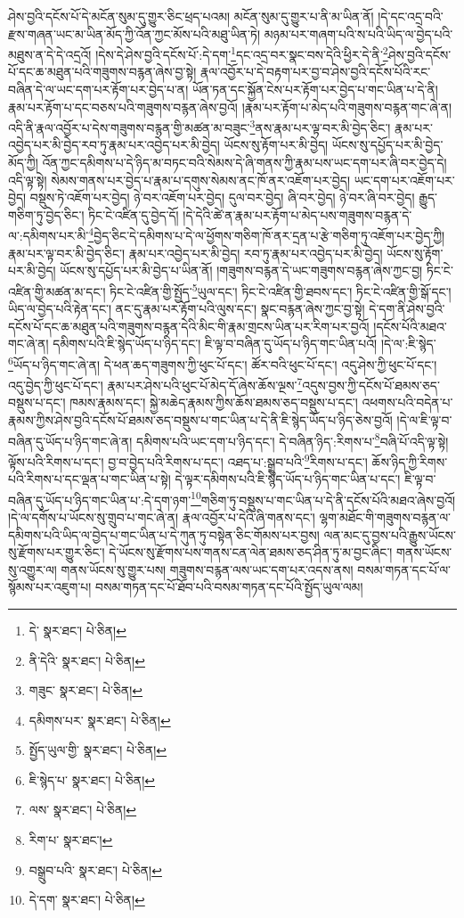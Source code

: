 ཤེས་བྱའི་དངོས་པོ་དེ་མངོན་སུམ་དུ་གྱུར་ཅིང་ཕྲད་པའམ། མངོན་སུམ་དུ་གྱུར་པ་ནི་མ་ཡིན་ནོ། །དེ་དང་འདྲ་བའི་རྫས་གཞན་ཡང་མ་ཡིན་མོད་ཀྱི་འོན་ཀྱང་མོས་པའི་མཐུ་ཡིན་ཏེ། མཉམ་པར་གཞག་པའི་ས་པའི་ཡིད་ལ་བྱེད་པའི་མཐུས་ན་དེ་དེ་འདྲའོ། །དེས་དེ་ཤེས་བྱའི་དངོས་པོ་:དེ་དག་\footnote{དེ་  སྣར་ཐང་།  པེ་ཅིན། }དང་འདྲ་བར་སྣང་བས་དེའི་ཕྱིར་དེ་ནི་\footnote{ནི་དེའི་  སྣར་ཐང་།  པེ་ཅིན། }ཤེས་བྱའི་དངོས་པོ་དང་ཆ་མཐུན་པའི་གཟུགས་བརྙན་ཞེས་བྱ་སྟེ། རྣལ་འབྱོར་པ་དེ་བརྟག་པར་བྱ་བ་ཤེས་བྱའི་དངོས་པོའི་རང་བཞིན་དེ་ལ་ཡང་དག་པར་རྟོག་པར་བྱེད་པ་ན། ཡོན་ཏན་དང་སྐྱོན་ངེས་པར་རྟོག་པར་བྱེད་པ་གང་ཡིན་པ་དེ་ནི། རྣམ་པར་རྟོག་པ་དང་བཅས་པའི་གཟུགས་བརྙན་ཞེས་བྱའོ། །རྣམ་པར་རྟོག་པ་མེད་པའི་གཟུགས་བརྙན་གང་ཞེ་ན། འདི་ནི་རྣལ་འབྱོར་པ་དེས་གཟུགས་བརྙན་གྱི་མཚན་མ་བཟུང་\footnote{གཟུང་  སྣར་ཐང་།  པེ་ཅིན། }ནས་རྣམ་པར་ལྟ་བར་མི་བྱེད་ཅིང་། རྣམ་པར་འབྱེད་པར་མི་བྱེད་རབ་ཏུ་རྣམ་པར་འབྱེད་པར་མི་བྱེད། ཡོངས་སུ་རྟོག་པར་མི་བྱེད། ཡོངས་སུ་དཔྱོད་པར་མི་བྱེད་མོད་ཀྱི། འོན་ཀྱང་དམིགས་པ་དེ་ཉིད་མ་བཏང་བའི་སེམས་དེ་ཞི་གནས་ཀྱི་རྣམ་པས་ཡང་དག་པར་ཞི་བར་བྱེད་དེ། འདི་ལྟ་སྟེ། སེམས་གནས་པར་བྱེད་པ་རྣམ་པ་དགུས་སེམས་ནང་ཁོ་ནར་འཇོག་པར་བྱེད། ཡང་དག་པར་འཇོག་པར་བྱེད། བསྡུས་ཏེ་འཇོག་པར་བྱེད། ཉེ་བར་འཇོག་པར་བྱེད། དུལ་བར་བྱེད། ཞི་བར་བྱེད། ཉེ་བར་ཞི་བར་བྱེད། རྒྱུད་གཅིག་ཏུ་བྱེད་ཅིང་། ཏིང་ངེ་འཛིན་དུ་བྱེད་དོ། །དེ་དེའི་ཚེ་ན་རྣམ་པར་རྟོག་པ་མེད་པས་གཟུགས་བརྙན་དེ་ལ་:དམིགས་པར་མི་\footnote{དམིགས་པར་  སྣར་ཐང་།  པེ་ཅིན། }བྱེད་ཅིང་དེ་དམིགས་པ་དེ་ལ་ཕྱོགས་གཅིག་ཁོ་ནར་དྲན་པ་རྩེ་གཅིག་ཏུ་འཇོག་པར་བྱེད་ཀྱི། རྣམ་པར་ལྟ་བར་མི་བྱེད་ཅིང་། རྣམ་པར་འབྱེད་པར་མི་བྱེད། རབ་ཏུ་རྣམ་པར་འབྱེད་པར་མི་བྱེད། ཡོངས་སུ་རྟོག་པར་མི་བྱེད། ཡོངས་སུ་དཔྱོད་པར་མི་བྱེད་པ་ཡིན་ནོ། །གཟུགས་བརྙན་དེ་ཡང་གཟུགས་བརྙན་ཞེས་ཀྱང་བྱ། ཏིང་ངེ་འཛིན་གྱི་མཚན་མ་དང་། ཏིང་ངེ་འཛིན་གྱི་སྤྱོད་\footnote{སྤྱོད་ཡུལ་གྱི་  སྣར་ཐང་།  པེ་ཅིན། }ཡུལ་དང་། ཏིང་ངེ་འཛིན་གྱི་ཐབས་དང་། ཏིང་ངེ་འཛིན་གྱི་སྒོ་དང་། ཡིད་ལ་བྱེད་པའི་རྟེན་དང་། ནང་དུ་རྣམ་པར་རྟོག་པའི་ལུས་དང་། སྣང་བརྙན་ཞེས་ཀྱང་བྱ་སྟེ། དེ་དག་ནི་ཤེས་བྱའི་དངོས་པོ་དང་ཆ་མཐུན་པའི་གཟུགས་བརྙན་དེའི་མིང་གི་རྣམ་གྲངས་ཡིན་པར་རིག་པར་བྱའོ། །དངོས་པོའི་མཐའ་གང་ཞེ་ན། དམིགས་པའི་ཇི་སྙེད་ཡོད་པ་ཉིད་དང་། ཇི་ལྟ་བ་བཞིན་དུ་ཡོད་པ་ཉིད་གང་ཡིན་པའོ། །དེ་ལ་:ཇི་སྙེད་\footnote{ཇི་སྙེད་པ་  སྣར་ཐང་།  པེ་ཅིན། }ཡོད་པ་ཉིད་གང་ཞེ་ན། དེ་ཕན་ཆད་གཟུགས་ཀྱི་ཕུང་པོ་དང་། ཚོར་བའི་ཕུང་པོ་དང་། འདུ་ཤེས་ཀྱི་ཕུང་པོ་དང་། འདུ་བྱེད་ཀྱི་ཕུང་པོ་དང་། རྣམ་པར་ཤེས་པའི་ཕུང་པོ་མེད་དོ་ཞེས་ཆོས་ལྔས་\footnote{ལས་  སྣར་ཐང་།  པེ་ཅིན། }འདུས་བྱས་ཀྱི་དངོས་པོ་ཐམས་ཅད་བསྡུས་པ་དང་། ཁམས་རྣམས་དང་། སྐྱེ་མཆེད་རྣམས་ཀྱིས་ཆོས་ཐམས་ཅད་བསྡུས་པ་དང་། འཕགས་པའི་བདེན་པ་རྣམས་ཀྱིས་ཤེས་བྱའི་དངོས་པོ་ཐམས་ཅད་བསྡུས་པ་གང་ཡིན་པ་དེ་ནི་ཇི་སྙེད་ཡོད་པ་ཉིད་ཅེས་བྱའོ། །དེ་ལ་ཇི་ལྟ་བ་བཞིན་དུ་ཡོད་པ་ཉིད་གང་ཞེ་ན། དམིགས་པའི་ཡང་དག་པ་ཉིད་དང་། དེ་བཞིན་ཉིད་:རིགས་པ་\footnote{རིག་པ་  སྣར་ཐང་། }བཞི་པོ་འདི་ལྟ་སྟེ། ལྟོས་པའི་རིགས་པ་དང་། བྱ་བ་བྱེད་པའི་རིགས་པ་དང་། འཐད་པ་:སྒྲུབ་པའི་\footnote{བསྒྲུབ་པའི་  སྣར་ཐང་།  པེ་ཅིན། }རིགས་པ་དང་། ཆོས་ཉིད་ཀྱི་རིགས་པའི་རིགས་པ་དང་ལྡན་པ་གང་ཡིན་པ་སྟེ། དེ་ལྟར་དམིགས་པའི་ཇི་སྙེད་ཡོད་པ་ཉིད་གང་ཡིན་པ་དང་། ཇི་ལྟ་བ་བཞིན་དུ་ཡོད་པ་ཉིད་གང་ཡིན་པ་:དེ་དག་ཉག་\footnote{དེ་དག་  སྣར་ཐང་།  པེ་ཅིན། }གཅིག་ཏུ་བསྡུས་པ་གང་ཡིན་པ་དེ་ནི་དངོས་པོའི་མཐའ་ཞེས་བྱའོ། །དེ་ལ་དགོས་པ་ཡོངས་སུ་གྲུབ་པ་གང་ཞེ་ན། རྣལ་འབྱོར་པ་དེའི་ཞི་གནས་དང་། ལྷག་མཐོང་གི་གཟུགས་བརྙན་ལ་དམིགས་པའི་ཡིད་ལ་བྱེད་པ་གང་ཡིན་པ་དེ་ཀུན་ཏུ་བསྟེན་ཅིང་གོམས་པར་བྱས། ལན་མང་དུ་བྱས་པའི་རྒྱུས་ཡོངས་སུ་རྫོགས་པར་གྱུར་ཅིང་། དེ་ཡོངས་སུ་རྫོགས་པས་གནས་ངན་ལེན་ཐམས་ཅད་ཤིན་ཏུ་མ་བྱང་ཞིང་། གནས་ཡོངས་སུ་འགྱུར་ལ། གནས་ཡོངས་སུ་གྱུར་པས། གཟུགས་བརྙན་ལས་ཡང་དག་པར་འདས་ནས། བསམ་གཏན་དང་པོ་ལ་སྙོམས་པར་འཇུག་པ། བསམ་གཏན་དང་པོ་ཐོབ་པའི་བསམ་གཏན་དང་པོའི་སྤྱོད་ཡུལ་ལམ། 